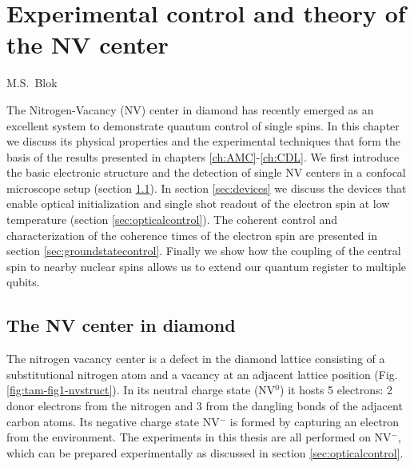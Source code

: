 \graphicspath{{./ch_theory_and_methods/figures/}}


\chapter{Experimental control and theory of the NV center}
\label{ch:TAM}

\begin{center} 
    \vspace{-1cm} {M.S.~Blok} 
\end{center}


\vspace{-0.5cm} 
The Nitrogen-Vacancy (NV) center in diamond has recently emerged as an excellent system to demonstrate quantum control of single spins. In this chapter we discuss its physical properties and the experimental techniques that form the basis of the results presented in chapters \ref{ch:AMC}-\ref{ch:CDL}. We first introduce the basic electronic structure and the detection of single NV centers in a confocal microscope setup (section \ref{sec:NVcenter}). In section \ref{sec:devices} we discuss the devices that enable optical initialization and single shot readout of the electron spin at low temperature (section \ref{sec:opticalcontrol}). The coherent control and characterization of the coherence times of the electron spin are presented in section \ref{sec:groundstatecontrol}. Finally we show how the coupling of the central spin to nearby nuclear spins allows us to extend our quantum register to multiple qubits.
\clearpage


\section{The NV center in diamond}
\label{sec:NVcenter}

The nitrogen vacancy center is a defect in the diamond lattice consisting of a substitutional nitrogen atom and a vacancy at an adjacent lattice position (Fig. \ref{fig:tam-fig1-nvstruct}). In its neutral charge state (NV$^{0}$) it hosts 5 electrons: 2 donor electrons from the nitrogen and 3 from the dangling bonds of the adjacent carbon atoms. Its negative charge state NV$^{-}$ is formed by capturing an electron from the environment. The experiments in this thesis are all performed on NV$^{-}$, which can be prepared experimentally as discussed in section \ref{sec:opticalcontrol}.

